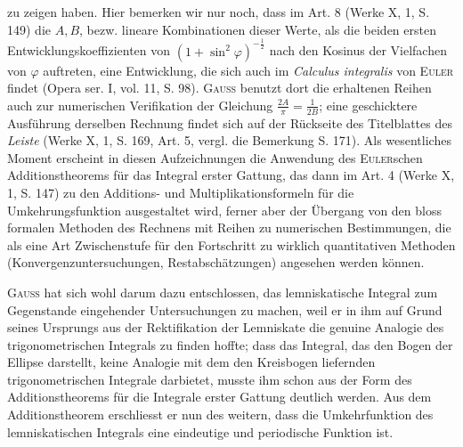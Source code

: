 zu zeigen haben. Hier bemerken wir nur noch, dass im Art. 8 (Werke X, 1,
S. 149) die \(A,B\), bezw. lineare Kombinationen dieser Werte, als die beiden ersten
Entwicklungskoeffizienten von \((1+\sin^2\varphi)^{-\frac12}\) nach den Kosinus der Vielfachen
von \(\varphi\) auftreten, eine Entwicklung, die sich auch im \textit{Calculus integralis} von
\textsc{Euler} findet (Opera ser. I, vol. 11, S. 98). \textsc{Gauss} benutzt dort die erhaltenen
Reihen auch zur numerischen Verifikation der Gleichung \(\frac{2A}{\pi}=\frac1{2B}\); eine
geschicktere Ausführung derselben Rechnung findet sich auf der Rückseite
des Titelblattes des \textit{Leiste} (Werke X, 1, S. 169, Art. 5, vergl. die Bemerkung
S. 171). Als wesentliches Moment erscheint in diesen Aufzeichnungen die
Anwendung des \textsc{Euler}schen Additionstheorems für das Integral erster Gattung,
das dann im Art. 4 (Werke X, 1, S. 147) zu den Additions- und Multiplikationsformeln
für die Umkehrungsfunktion ausgestaltet wird, ferner aber der
Übergang von den bloss formalen Methoden des Rechnens mit Reihen zu
numerischen Bestimmungen, die als eine Art Zwischenstufe für den Fortschritt
zu wirklich quantitativen Methoden (Konvergenzuntersuchungen, Restabschätzungen)
angesehen werden können.

\textsc{Gauss} hat sich wohl darum dazu entschlossen, das lemniskatische Integral
zum Gegenstande eingehender Untersuchungen zu machen, weil er in ihm
auf Grund seines Ursprungs aus der Rektifikation der Lemniskate die genuine
Analogie des trigonometrischen Integrals zu finden hoffte; dass das Integral,
das den Bogen der Ellipse darstellt, keine Analogie mit dem den Kreisbogen
liefernden trigonometrischen Integrale darbietet, musste ihm schon aus der
Form des Additionstheorems für die Integrale erster Gattung deutlich werden.
Aus dem Additionstheorem erschliesst er nun des weitern, dass die Umkehrfunktion
des lemniskatischen Integrals eine eindeutige und periodische Funktion
ist.
